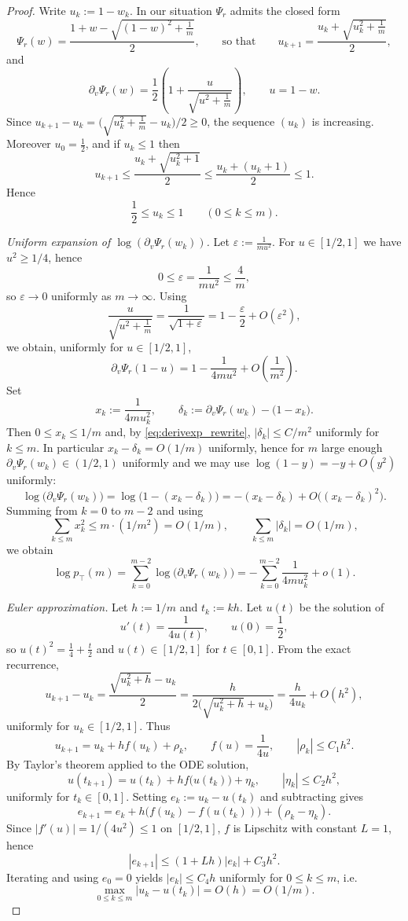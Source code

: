 \documentclass[10pt,a4paper]{amsart}
\newcommand{\ptop}{p_{\top}}
\begin{document}
\begin{proof}
Write \(u_k:=1-w_k\). In our situation \(\Psi_r\) admits the closed form
\[
\Psi_r(w)=\frac{1+w-\sqrt{(1-w)^2+\frac1m}}{2},
\qquad\text{so that}\qquad
u_{k+1}=\frac{u_k+\sqrt{u_k^2+\frac1m}}{2},
\]
and
\[
\partial_v\Psi_r(w)
=\frac12\left(1+\frac{u}{\sqrt{u^2+\frac1m}}\right),
\qquad u=1-w.
\]
Since \(u_{k+1}-u_k=\bigl(\sqrt{u_k^2+\frac1m}-u_k\bigr)/2\ge0\), the sequence \((u_k)\) is increasing.
Moreover \(u_0=\frac12\), and if \(u_k\le 1\) then
\[
u_{k+1}\le \frac{u_k+\sqrt{u_k^2+1}}{2}\le \frac{u_k+(u_k+1)}{2}\le 1.
\]
Hence
\[
\frac12\le u_k\le 1\qquad (0\le k\le m).
\]

\medskip
\noindent
\emph{Uniform expansion of \(\log(\partial_v\Psi_r(w_k))\).}
Let \(\varepsilon:=\frac{1}{m u^2}\). For \(u\in[1/2,1]\) we have \(u^2\ge 1/4\), hence
\[
0\le \varepsilon=\frac{1}{m u^2}\le \frac{4}{m},
\]
so \(\varepsilon\to0\) uniformly as \(m\to\infty\). Using
\[
\frac{u}{\sqrt{u^2+\frac1m}}=\frac{1}{\sqrt{1+\varepsilon}}
=1-\frac{\varepsilon}{2}+O(\varepsilon^2),
\]
we obtain, uniformly for \(u\in[1/2,1]\),
\begin{equation}
\label{eq:derivexp_rewrite}
\partial_v\Psi_r(1-u)
=1-\frac{1}{4m u^2}+O\!\left(\frac{1}{m^2}\right).
\end{equation}
Set
\[
x_k:=\frac{1}{4m u_k^2},\qquad \delta_k:=\partial_v\Psi_r(w_k)-\bigl(1-x_k\bigr).
\]
Then \(0\le x_k\le 1/m\) and, by \eqref{eq:derivexp_rewrite}, \(|\delta_k|\le C/m^2\) uniformly for \(k\le m\).
In particular \(x_k-\delta_k=O(1/m)\) uniformly, hence for \(m\) large enough \(\partial_v\Psi_r(w_k)\in(1/2,1)\)
uniformly and we may use \(\log(1-y)=-y+O(y^2)\) uniformly:
\[
\log\bigl(\partial_v\Psi_r(w_k)\bigr)
=\log\bigl(1-(x_k-\delta_k)\bigr)
=-(x_k-\delta_k)+O\bigl((x_k-\delta_k)^2\bigr).
\]
Summing from \(k=0\) to \(m-2\) and using
\[
\sum_{k\le m}x_k^2\le m\cdot (1/m^2)=O(1/m),\qquad
\sum_{k\le m}|\delta_k|=O(1/m),
\]
we obtain
\begin{equation}
\label{eq:logp1_rewrite}
\log \ptop(m)
=\sum_{k=0}^{m-2}\log\bigl(\partial_v\Psi_r(w_k)\bigr)
=-\sum_{k=0}^{m-2}\frac{1}{4m u_k^2}+o(1).
\end{equation}

\medskip
\noindent
\emph{Euler approximation.}
Let \(h:=1/m\) and \(t_k:=kh\). Let \(u(t)\) be the solution of
\[
u'(t)=\frac{1}{4u(t)},\qquad u(0)=\frac12,
\]
so \(u(t)^2=\frac14+\frac{t}{2}\) and \(u(t)\in[1/2,1]\) for \(t\in[0,1]\).
From the exact recurrence,
\[
u_{k+1}-u_k=\frac{\sqrt{u_k^2+h}-u_k}{2}
=\frac{h}{2\bigl(\sqrt{u_k^2+h}+u_k\bigr)}
=\frac{h}{4u_k}+O(h^2),
\]
uniformly for \(u_k\in[1/2,1]\). Thus
\[
u_{k+1}=u_k+h f(u_k)+\rho_k,\qquad f(u)=\frac{1}{4u},\qquad |\rho_k|\le C_1 h^2.
\]
By Taylor's theorem applied to the ODE solution,
\[
u(t_{k+1})=u(t_k)+h f\bigl(u(t_k)\bigr)+\eta_k,\qquad |\eta_k|\le C_2 h^2,
\]
uniformly for \(t_k\in[0,1]\). Setting \(e_k:=u_k-u(t_k)\) and subtracting gives
\[
e_{k+1}=e_k+h\bigl(f(u_k)-f(u(t_k))\bigr)+(\rho_k-\eta_k).
\]
Since \(|f'(u)|=1/(4u^2)\le 1\) on \([1/2,1]\), \(f\) is Lipschitz with constant \(L=1\), hence
\[
|e_{k+1}|\le (1+Lh)|e_k|+C_3 h^2.
\]
Iterating and using \(e_0=0\) yields \(|e_k|\le C_4 h\) uniformly for \(0\le k\le m\), i.e.
\[
\max_{0\le k\le m}|u_k-u(t_k)|=O(h)=O(1/m).
\]


\end{proof}
\end{document}
